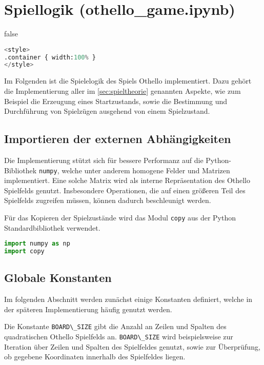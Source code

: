 \hypertarget{spiellogik-othello_game.ipynb}{%
\section{Spiellogik
(othello\_game.ipynb)}\label{spiellogik-othello_game.ipynb}}

\label{sec:gamelogic} \ifx false

\begin{lstlisting}[language=Python]
%%HTML
<style>
.container { width:100% }
</style>
\end{lstlisting}

\fi Im Folgenden ist die Spielelogik des Spiels Othello implementiert.
Dazu gehört die Implementierung aller im \autoref{sec:spieltheorie}
genannten Aspekte, wie zum Beispiel die Erzeugung eines Startzustands,
sowie die Bestimmung und Durchführung von Spielzügen ausgehend von einem
Spielzustand.

\hypertarget{importieren-der-externen-abhuxe4ngigkeiten}{%
\subsection{Importieren der externen
Abhängigkeiten}\label{importieren-der-externen-abhuxe4ngigkeiten}}

Die Implementierung stützt sich für bessere Performanz auf die
Python-Bibliothek \passthrough{\lstinline!numpy!}, welche unter anderem
homogene Felder und Matrizen implementiert. Eine solche Matrix wird als
interne Repräsentation des Othello Spielfelds genutzt. Insbesondere
Operationen, die auf einen größeren Teil des Spielfelds zugreifen
müssen, können dadurch beschleunigt werden.

Für das Kopieren der Spielzustände wird das Modul
\passthrough{\lstinline!copy!} aus der Python Standardbibliothek
verwendet.

\begin{lstlisting}[language=Python]
import numpy as np
import copy
\end{lstlisting}

\hypertarget{globale-konstanten}{%
\subsection{Globale Konstanten}\label{globale-konstanten}}

Im folgenden Abschnitt werden zunächst einige Konstanten definiert,
welche in der späteren Implementierung häufig genutzt werden.

Die Konstante \passthrough{\lstinline!BOARD\_SIZE!} gibt die Anzahl an
Zeilen und Spalten des quadratischen Othello Spielfelds an.
\passthrough{\lstinline!BOARD\_SIZE!} wird beispielsweise zur Iteration
über Zeilen und Spalten des Spielfeldes genutzt, sowie zur Überprüfung,
ob gegebene Koordinaten innerhalb des Spielfeldes liegen.

